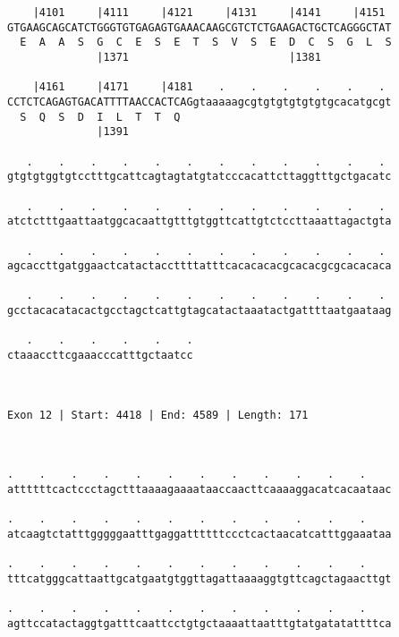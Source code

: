 \documentclass{article}
\begin{document}
\begin{Verbatim}
    |4101     |4111     |4121     |4131     |4141     |4151 
GTGAAGCAGCATCTGGGTGTGAGAGTGAAACAAGCGTCTCTGAAGACTGCTCAGGGCTAT
  E  A  A  S  G  C  E  S  E  T  S  V  S  E  D  C  S  G  L  S
              |1371                         |1381           
  
    |4161     |4171     |4181    .    .    .    .    .    . 
CCTCTCAGAGTGACATTTTAACCACTCAGgtaaaaagcgtgtgtgtgtgtgcacatgcgt
  S  Q  S  D  I  L  T  T  Q                                 
              |1391                                         
  
   .    .    .    .    .    .    .    .    .    .    .    . 
gtgtgtggtgtcctttgcattcagtagtatgtatcccacattcttaggtttgctgacatc
                                                            
   .    .    .    .    .    .    .    .    .    .    .    . 
atctctttgaattaatggcacaattgtttgtggttcattgtctccttaaattagactgta
                                                            
   .    .    .    .    .    .    .    .    .    .    .    . 
agcaccttgatggaactcatactaccttttatttcacacacacgcacacgcgcacacaca
                                                            
   .    .    .    .    .    .    .    .    .    .    .    . 
gcctacacatacactgcctagctcattgtagcatactaaatactgattttaatgaataag
                                                            
   .    .    .    .    .    .
ctaaaccttcgaaacccatttgctaatcc
                             
                             
 
Exon 12 | Start: 4418 | End: 4589 | Length: 171



.    .    .    .    .    .    .    .    .    .    .    .    
attttttcactccctagctttaaaagaaaataaccaacttcaaaaggacatcacaataac
                                                            
.    .    .    .    .    .    .    .    .    .    .    .    
atcaagtctatttgggggaatttgaggattttttccctcactaacatcatttggaaataa
                                                            
.    .    .    .    .    .    .    .    .    .    .    .    
tttcatgggcattaattgcatgaatgtggttagattaaaaggtgttcagctagaacttgt
                                                            
.    .    .    .    .    .    .    .    .    .    .    .    
agttccatactaggtgatttcaattcctgtgctaaaattaatttgtatgatatattttca
                                                            

\end{Verbatim}
\end{document}
